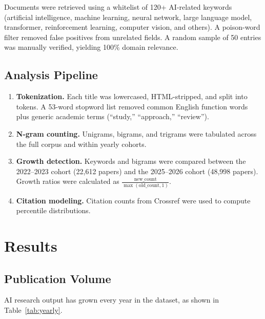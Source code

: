 \documentclass[11pt]{article}
\begin{document}
Documents were retrieved using a whitelist of 120+ AI-related keywords (artificial intelligence, machine learning, neural network, large language model, transformer, reinforcement learning, computer vision, and others). A poison-word filter removed false positives from unrelated fields. A random sample of 50 entries was manually verified, yielding 100\% domain relevance.

\subsection{Analysis Pipeline}

\begin{enumerate}
\item \textbf{Tokenization.} Each title was lowercased, HTML-stripped, and split into tokens. A 53-word stopword list removed common English function words plus generic academic terms (``study,'' ``approach,'' ``review'').
\item \textbf{N-gram counting.} Unigrams, bigrams, and trigrams were tabulated across the full corpus and within yearly cohorts.
\item \textbf{Growth detection.} Keywords and bigrams were compared between the 2022--2023 cohort (22,612 papers) and the 2025--2026 cohort (48,998 papers). Growth ratios were calculated as $\frac{\text{new\_count}}{\max(\text{old\_count}, 1)}$.
\item \textbf{Citation modeling.} Citation counts from Crossref were used to compute percentile distributions.
\end{enumerate}

\section{Results}
\label{sec:results}

\subsection{Publication Volume}

AI research output has grown every year in the dataset, as shown in Table~\ref{tab:yearly}.
\end{document}
